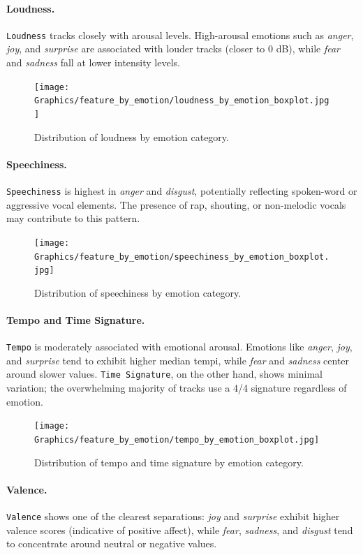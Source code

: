 \documentclass{article}
\begin{document}
\paragraph{Loudness.}
\texttt{Loudness} tracks closely with arousal levels. High-arousal emotions such as \textit{anger}, \textit{joy}, and \textit{surprise} are associated with louder tracks (closer to 0 dB), while \textit{fear} and \textit{sadness} fall at lower intensity levels.

\begin{figure}[H]
\centering
\texttt{[image: Graphics/feature\_by\_emotion/loudness\_by\_emotion\_boxplot.jpg]}
\caption{Distribution of loudness by emotion category.}
\label{fig:loudness}
\end{figure}

\paragraph{Speechiness.}
\texttt{Speechiness} is highest in \textit{anger} and \textit{disgust}, potentially reflecting spoken-word or aggressive vocal elements. The presence of rap, shouting, or non-melodic vocals may contribute to this pattern.

\begin{figure}[H]
\centering
\texttt{[image: Graphics/feature\_by\_emotion/speechiness\_by\_emotion\_boxplot.jpg]}
\caption{Distribution of speechiness by emotion category.}
\label{fig:speechiness}
\end{figure}

\paragraph{Tempo and Time Signature.}
\texttt{Tempo} is moderately associated with emotional arousal. Emotions like \textit{anger}, \textit{joy}, and \textit{surprise} tend to exhibit higher median tempi, while \textit{fear} and \textit{sadness} center around slower values. \texttt{Time Signature}, on the other hand, shows minimal variation; the overwhelming majority of tracks use a 4/4 signature regardless of emotion.

\begin{figure}[H]
\centering
\texttt{[image: Graphics/feature\_by\_emotion/tempo\_by\_emotion\_boxplot.jpg]}
\caption{Distribution of tempo and time signature by emotion category.}
\label{fig:tempo}
\end{figure}

\paragraph{Valence.}
\texttt{Valence} shows one of the clearest separations: \textit{joy} and \textit{surprise} exhibit higher valence scores (indicative of positive affect), while \textit{fear}, \textit{sadness}, and \textit{disgust} tend to concentrate around neutral or negative values.
\end{document}
